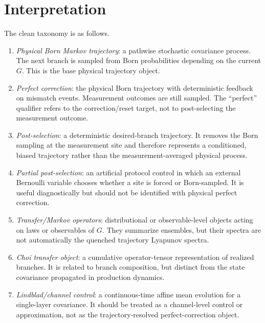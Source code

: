 \documentclass[aps,prb,onecolumn,nofootinbib,superscriptaddress]{revtex4-2}
\begin{document}
\section{Interpretation}

The clean taxonomy is as follows.

\begin{enumerate}
\item \emph{Physical Born Markov trajectory}: a pathwise stochastic covariance
process.  The next branch is sampled from Born probabilities depending on the
current \(G\).  This is the base physical trajectory object.

\item \emph{Perfect correction}: the physical Born trajectory with deterministic
feedback on mismatch events.  Measurement outcomes are still sampled.  The
``perfect'' qualifier refers to the correction/reset target, not to
post-selecting the measurement outcome.

\item \emph{Post-selection}: a deterministic desired-branch trajectory.  It
removes the Born sampling at the measurement site and therefore represents a
conditioned, biased trajectory rather than the measurement-averaged physical
process.

\item \emph{Partial post-selection}: an artificial protocol control in which an
external Bernoulli variable chooses whether a site is forced or Born-sampled.
It is useful diagnostically but should not be identified with physical perfect
correction.

\item \emph{Transfer/Markov operators}: distributional or observable-level
objects acting on laws or observables of \(G\).  They summarize ensembles, but
their spectra are not automatically the quenched trajectory Lyapunov spectra.

\item \emph{Choi transfer object}: a cumulative operator-tensor representation
of realized branches.  It is related to branch composition, but distinct from
the state covariance propagated in production dynamics.

\item \emph{Lindblad/channel control}: a continuous-time affine mean evolution
for a single-layer covariance.  It should be treated as a channel-level control
or approximation, not as the trajectory-resolved perfect-correction object.
\end{enumerate}
\end{document}
